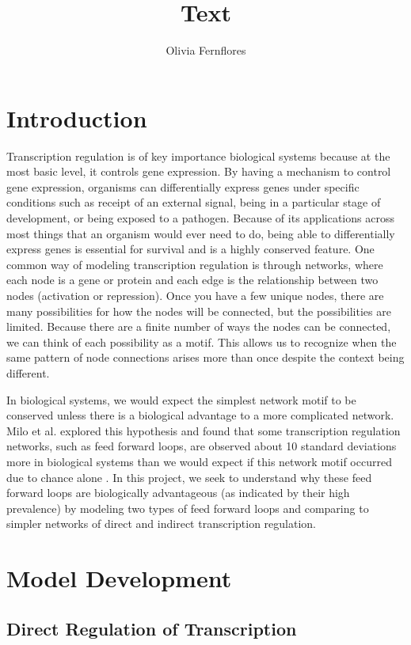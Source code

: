 \documentclass{article}
\title{Text}
\author{Olivia Fernflores}
\begin{document}
\maketitle

\section{Introduction}
Transcription regulation is of key importance biological systems because at the most basic level, it controls gene expression. By having a mechanism to control gene expression, organisms can differentially express genes under specific conditions such as receipt of an external signal, being in a particular stage of development, or being exposed to a pathogen. Because of its applications across most things that an organism would ever need to do, being able to differentially express genes is essential for survival and is a highly conserved feature. One common way of modeling transcription regulation is through networks, where each node is a gene or protein and each edge is the relationship between two nodes (activation or repression). Once you have a few unique nodes, there are many possibilities for how the nodes will be connected, but the possibilities are limited. Because there are a finite number of ways the nodes can be connected, we can think of each possibility as a motif. This allows us to recognize when the same pattern of node connections arises more than once despite the context being different. 

In biological systems, we would expect the simplest network motif to be conserved unless there is a biological advantage to a more complicated network. Milo et al. explored this hypothesis and found that some transcription regulation networks, such as feed forward loops, are observed about 10 standard deviations more in biological systems than we would expect if this network motif occurred due to chance alone \cite{Milo2002}. In this project, we seek to understand why these feed forward loops are biologically advantageous (as indicated by their high prevalence) by modeling two types of feed forward loops and comparing to simpler networks of direct and indirect transcription regulation. 

\section{Model Development}

\subsection{Direct Regulation of Transcription}
\end{document}
